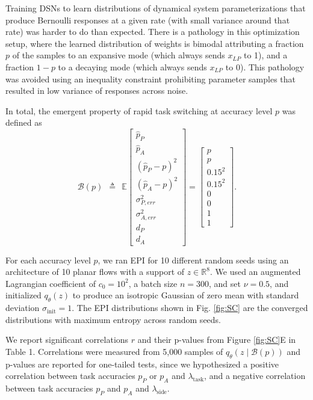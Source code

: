 \documentclass[11pt]{article}
\begin{document}
Training DSNs to learn distributions of dynamical system parameterizations that produce Bernoulli responses at a given rate (with small variance around that rate) was harder to do than expected.  There is a pathology in this optimization setup, where the learned distribution of weights is bimodal attributing a fraction $p$ of the samples to an expansive mode (which always sends $x_{LP}$ to 1), and a fraction $1-p$ to a decaying mode (which always sends $x_{LP}$ to 0).  This pathology was avoided using an inequality constraint prohibiting parameter samples that resulted in low variance of responses across noise.

In total, the emergent property of rapid task switching at accuracy level $p$ was defined as
\begin{equation}
\mathcal{B}(p) ~~\triangleq~~ \mathbb{E}\begin{bmatrix} \hat{p}_P \\ \hat{p}_A \\ (\hat{p}_P-p)^2 \\ (\hat{p}_A - p)^2 \\ \sigma^2_{P,err} \\ \sigma^2_{A,err} \\ d_P \\ d_A \end{bmatrix} = \begin{bmatrix} p \\ p \\ 0.15^2 \\ 0.15^2 \\ 0 \\ 0 \\ 1 \\ 1 \end{bmatrix}.
\end{equation}

For each accuracy level $p$, we ran EPI for 10 different random seeds  using an architecture of 10 planar flows with a  support of $z \in \mathbb{R}^8$.   
We used an augmented Lagrangian coefficient of $c_0 = 10^2$, a batch size $n=300$, and set $\nu = 0.5$, and initialized $q_\theta(z)$ to produce an isotropic Gaussian of zero mean with standard deviation $\sigma_{\text{init}} = 1$.
The EPI distributions shown in Fig. \ref{fig:SC} are the converged distributions with maximum entropy across random seeds.

We report significant correlations $r$ and their p-values from Figure \ref{fig:SC}E in Table 1.  Correlations were measured from 5,000 samples of $q_\theta(z \mid \mathcal{B}(p))$ and p-values are reported for one-tailed tests, since we hypothesized a positive correlation between task accuracies $p_P$ or $p_A$ and $\lambda_{\text{task}}$, and a negative correlation between task accuracies $p_P$ and $p_A$ and $\lambda_{\text{side}}$.
\end{document}
